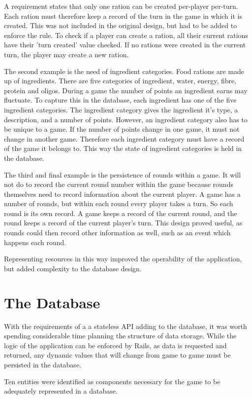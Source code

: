 A requirement states that only one ration can be created per-player per-turn. Each ration must therefore keep a record of the turn in the game in which it is created. This was not included in the original design, but had to be added to enforce the rule. To check if a player can create a ration, all their current rations have their 'turn created' value checked. If no rations were created in the current turn, the player may create a new ration.

The second example is the need of ingredient categories. Food rations are made up of ingredients. There are five categories of ingredient, water, energy, fibre, protein and oligos. During a game the number of points an ingredient earns may fluctuate. To capture this in the database, each ingredient has one of the five ingredient categories. The ingredient category gives the ingredient it's type, a description, and a number of points. However, an ingredient category also has to be unique to a game. If the number of points change in one game, it must not change in another game. Therefore each ingredient category must have a record of the game it belongs to. This way the state of ingredient categories is held in the database.

The third and final example is the persistence of rounds within a game. It will not do to record the current round number within the game because rounds themselves need to record information about the current player. A game has a number of rounds, but within each round every player takes a turn. So each round is its own record. A game keeps a record of the current round, and the round keeps a record of the current player's turn. This design proved useful, as rounds could then record other information as well, such as an event which happens each round.

Representing resources in this way improved the operability of the application, but added complexity to the database design.

\section{The Database}
With the requirements of a a stateless API adding to the database, it was worth spending considerable time planning the structure of data storage. While the logic of the application can be enforced by Rails, as data is requested and returned, any dynamic values that will change from game to game must be persisted in the database.

Ten entities were identified as components necessary for the game to be adequately represented in a database.

